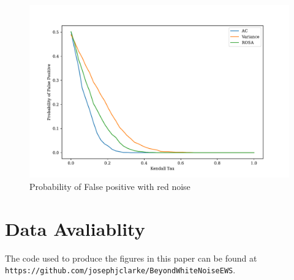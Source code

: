 \begin{figure}
  \centering
  \includegraphics[width=\textwidth]{false_positives_rednoise}
  \caption[False positive with red noise]{Probability of False positive with red noise}
  \label{fig:false_positive_red_noise}
\end{figure}

\section*{Data Avaliablity}
The code used to produce the figures in this paper can be found at \texttt{https://github.com/josephjclarke/BeyondWhiteNoiseEWS}.




